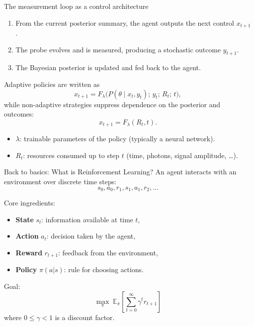 \documentclass[aspectratio=169]{beamer}
\begin{document}
\begin{frame}{The measurement loop as a control architecture}
\begin{enumerate}
  \item From the current posterior summary, the agent outputs the next control $x_{t+1}$.
  \item The probe evolves and is measured, producing a stochastic outcome $y_{t+1}$.
  \item The Bayesian posterior is updated and fed back to the agent.
\end{enumerate}
\vspace{0.5em}
Adaptive policies are written as
\[
  x_{t+1}=F_{\lambda}\!\big(P(\theta\mid x_t,y_t);\, y_t;\, R_t;\, t\big),
\]
while non-adaptive strategies suppress dependence on the posterior and outcomes:
\[
  x_{t+1}=F_{\lambda}(R_t,t).
\]
\begin{itemize}
  \item $\lambda$: trainable parameters of the policy (typically a neural network).
  \item $R_t$: resources consumed up to step $t$ (time, photons, signal amplitude, \ldots).
\end{itemize}
\end{frame}




\begin{frame}{Back to basics: What is Reinforcement Learning?}
  An agent interacts with an environment over discrete time steps:
  \[
  s_0,a_0,r_1,s_1,a_1,r_2,\dots
  \]

  Core ingredients:
  \begin{itemize}
  \item \textbf{State} $s_t$: information available at time $t$,
  \item \textbf{Action} $a_t$: decision taken by the agent,
  \item \textbf{Reward} $r_{t+1}$: feedback from the environment,
  \item \textbf{Policy} $\pi(a|s)$: rule for choosing actions.
  \end{itemize}

  Goal:
  \[
  \max_\pi \; \mathbb{E}_\pi\!\left[\sum_{t=0}^{\infty}\gamma^t r_{t+1}\right]
  \]
  where $0\le \gamma <1$ is a discount factor.
\end{frame}
\end{document}
